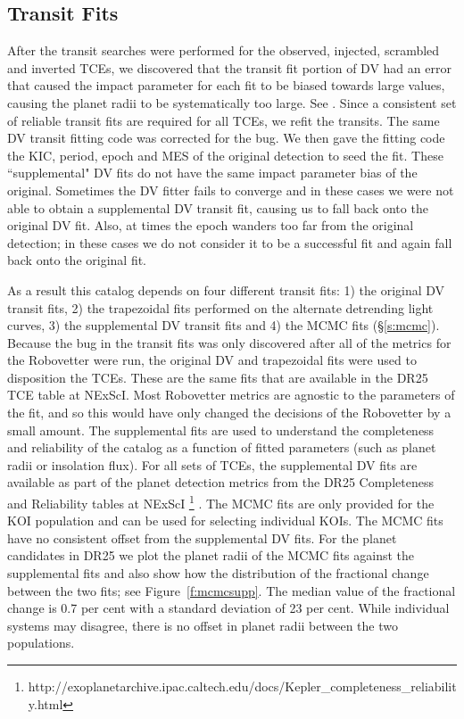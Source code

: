 \subsection{Transit Fits}

After the transit searches were performed for the observed, injected, scrambled and inverted TCEs, we discovered that the transit fit portion of DV had an error that caused the impact parameter for each fit to be biased towards large values, causing the planet radii to be systematically too large. See \citet{KSCI19110}. Since a consistent set of reliable transit fits are required for all TCEs, we refit the transits.  The same DV transit fitting code was corrected for the bug. We then gave the fitting code the KIC, period, epoch and MES of the original detection to seed the fit. These ``supplemental" DV fits do not have the same impact parameter bias of the original.  Sometimes the DV fitter fails to converge and in these cases we were not able to obtain a supplemental DV transit fit, causing us to fall back onto the original DV fit. Also, at times the epoch wanders too far from the original detection; in these cases we do not consider it to be a successful fit and again fall back onto the original fit.

As a result this catalog depends on four different transit fits: 1) the original DV transit fits, 2) the trapezoidal fits performed on the alternate detrending light curves, 3) the supplemental DV transit fits and 4) the MCMC fits (\S\ref{s:mcmc}).  Because the bug in the transit fits was only discovered after all of the metrics for the Robovetter were run, the original DV and trapezoidal fits were used to disposition the TCEs. These are the same fits that are available in the DR25 TCE table at NExScI.  Most Robovetter metrics are agnostic to the parameters of the fit, and so this would have only changed the decisions of the Robovetter by a small amount.  The supplemental fits are used to understand the completeness and reliability of the catalog as a function of fitted parameters (such as planet radii or insolation flux).  For all sets of TCEs, the supplemental DV fits are available as part of the planet detection metrics from the DR25 Completeness and Reliability tables at NExScI \footnote{http://exoplanetarchive.ipac.caltech.edu/docs/Kepler\_completeness\_reliability.html}  \citep{KSCI19110,KSCI19114}. The MCMC fits are only provided for the KOI population and can be used for selecting individual KOIs. The MCMC fits have no consistent offset from the supplemental DV fits.  For the planet candidates in DR25 we plot the planet radii of the MCMC fits against the supplemental fits and also show how the distribution of the fractional change between the two fits; see Figure~\ref{f:mcmcsupp}. The median value of the fractional change is 0.7 per cent with a standard deviation of 23 per cent. While individual systems may disagree, there is no offset in planet radii between the two populations.  

